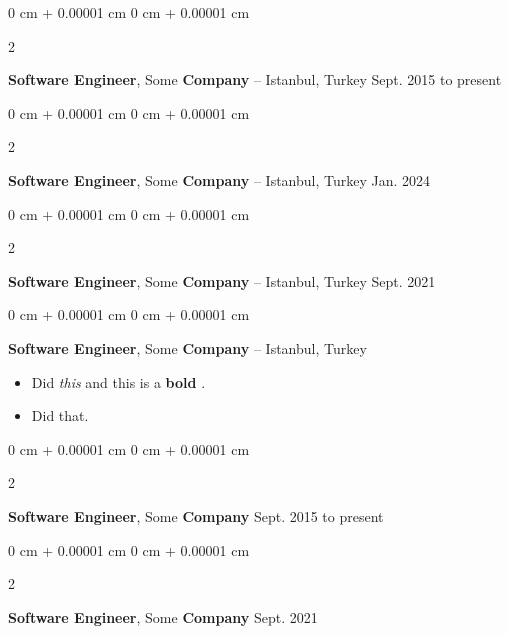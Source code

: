 \documentclass[10pt, letterpaper]{article}
\newenvironment{highlights}{
    \begin{itemize}[
        topsep=0.10 cm,
        parsep=0.10 cm,
        partopsep=0pt,
        itemsep=0pt,
        leftmargin=0 cm + 10pt
    ]
}{
    \end{itemize}
} %
\newenvironment{onecolentry}{
    \begin{adjustwidth}{
        0 cm + 0.00001 cm
    }{
        0 cm + 0.00001 cm
    }
}{
    \end{adjustwidth}
} %
\newenvironment{twocolentry}[2][]{
    \onecolentry
    \def\secondColumn{#2}
    \setcolumnwidth{\fill, 4.2cm}
    \begin{paracol}{2}
}{
    \switchcolumn \raggedleft \secondColumn
    \end{paracol}
    \endonecolentry
} %
\let\hrefWithoutArrow\href
\renewcommand{\href}[2]{\hrefWithoutArrow{#1}{\mbox{\ifthenelse{\equal{#2}{}}{ }{#2 }\raisebox{.15ex}{\footnotesize \faExternalLink*}}}}
\begin{document}
        \vspace{0.1 cm}

        \begin{twocolentry}{
            Sept. 2015 to present
        }
            \textbf{Software Engineer}, Some \textbf{Company} -- Istanbul, Turkey\end{twocolentry}


        \vspace{0.1 cm}

        \begin{twocolentry}{
            Jan. 2024
        }
            \textbf{Software Engineer}, Some \textbf{Company} -- Istanbul, Turkey\end{twocolentry}


        \vspace{0.1 cm}

        \begin{twocolentry}{
            Sept. 2021
        }
            \textbf{Software Engineer}, Some \textbf{Company} -- Istanbul, Turkey\end{twocolentry}


        \vspace{0.1 cm}

        \begin{onecolentry}
            \textbf{Software Engineer}, Some \textbf{Company} -- Istanbul, Turkey    \begin{highlights}
                \item Did \textit{this} and this is a \textbf{bold} \href{https://example.com}{link}.
                \item Did that.
            \end{highlights}
        \end{onecolentry}


        \vspace{0.1 cm}

        \begin{twocolentry}{
            Sept. 2015 to present
        }
            \textbf{Software Engineer}, Some \textbf{Company}\end{twocolentry}


        \vspace{0.1 cm}

        \begin{twocolentry}{
            Sept. 2021
        }
            \textbf{Software Engineer}, Some \textbf{Company}\end{twocolentry}
\end{document}
